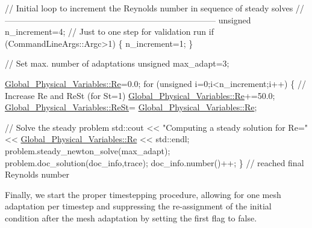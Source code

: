 \begin{DoxyCodeInclude}

 
 \textcolor{comment}{// Initial loop to increment the Reynolds number in sequence of steady solves}
 \textcolor{comment}{//---------------------------------------------------------------------------}
 \textcolor{keywordtype}{unsigned} n\_increment=4;
 \textcolor{comment}{// Just to one step for validation run}
 \textcolor{keywordflow}{if} (CommandLineArgs::Argc>1)
  \{
   n\_increment=1;
  \}

 \textcolor{comment}{// Set max. number of adaptations}
 \textcolor{keywordtype}{unsigned} max\_adapt=3;

 \hyperlink{namespaceGlobal__Physical__Variables_ab814e627d2eb5bc50318879d19ab16b9}{Global\_Physical\_Variables::Re}=0.0;
 \textcolor{keywordflow}{for} (\textcolor{keywordtype}{unsigned} i=0;i<n\_increment;i++)
  \{
   \textcolor{comment}{// Increase Re and ReSt (for St=1)}
   \hyperlink{namespaceGlobal__Physical__Variables_ab814e627d2eb5bc50318879d19ab16b9}{Global\_Physical\_Variables::Re}+=50.0;
   \hyperlink{namespaceGlobal__Physical__Variables_a085ee4bf968ffdd01a41b8c41864f907}{Global\_Physical\_Variables::ReSt}=
      \hyperlink{namespaceGlobal__Physical__Variables_ab814e627d2eb5bc50318879d19ab16b9}{Global\_Physical\_Variables::Re};

   \textcolor{comment}{// Solve the steady problem }
   std::cout << \textcolor{stringliteral}{"Computing a steady solution for Re="} 
             <<  \hyperlink{namespaceGlobal__Physical__Variables_ab814e627d2eb5bc50318879d19ab16b9}{Global\_Physical\_Variables::Re} << std::endl;
   problem.steady\_newton\_solve(max\_adapt);
   problem.doc\_solution(doc\_info,trace);
   doc\_info.number()++; 
  \} \textcolor{comment}{// reached final Reynolds number }

\end{DoxyCodeInclude}


Finally, we start the proper timestepping procedure, allowing for one mesh adaptation per timestep and suppressing the re-\/assignment of the initial condition after the mesh adaptation by setting the {\ttfamily first} flag to false.



